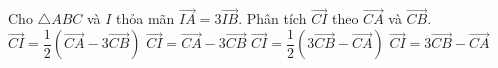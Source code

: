 \begin{ex}%
	Cho $\triangle ABC$ và $I$ thỏa mãn $\overrightarrow{IA}=3\overrightarrow{IB}$. Phân tích $\overrightarrow{CI}$ theo $\overrightarrow{CA}$ và $\overrightarrow{CB}$.
	\choice
	{$\overrightarrow{CI}=\dfrac{1}{2}\left(\overrightarrow{CA}-3\overrightarrow{CB}\right)$}
	{$\overrightarrow{CI}=\overrightarrow{CA}-3\overrightarrow{CB}$}
	{\True $\overrightarrow{CI}=\dfrac{1}{2}\left(3\overrightarrow{CB}-\overrightarrow{CA}\right)$}
	{$\overrightarrow{CI}=3\overrightarrow{CB}-\overrightarrow{CA}$}
\end{ex}

